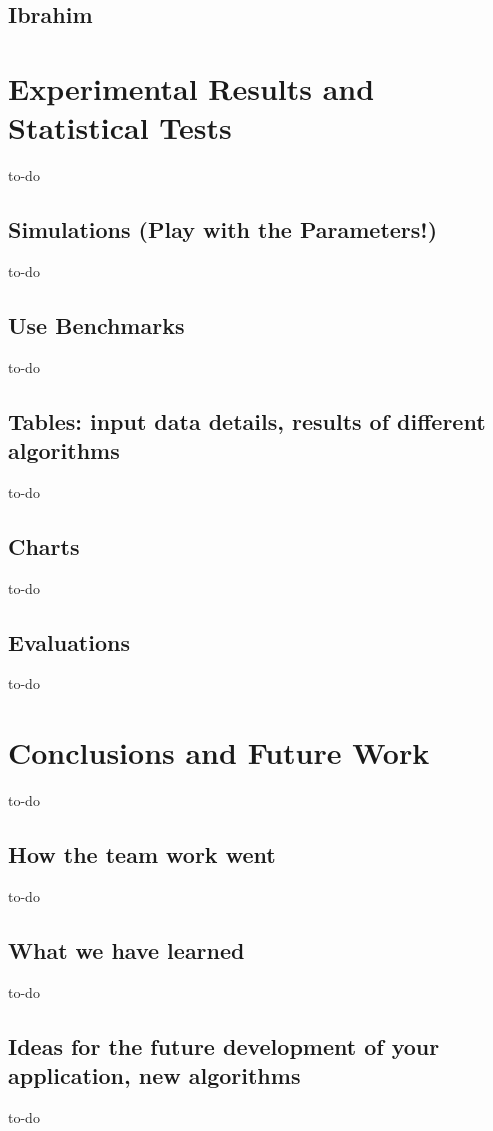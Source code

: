 \documentclass[a4paper,12pt]{article}
\begin{document}
\subsection{Ibrahim}

\section{Experimental Results and Statistical Tests}
to-do
\subsection{Simulations (Play with the Parameters!)}
to-do
\subsection{Use Benchmarks}
to-do
\subsection{Tables: input data details, results of different algorithms}
to-do
\subsection{Charts}
to-do
\subsection{Evaluations}
to-do

\section{Conclusions and Future Work}
to-do
\subsection{How the team work went}
to-do
\subsection{What we have learned}
to-do
\subsection{Ideas for the future development of your application, new algorithms}
to-do
\end{document}
